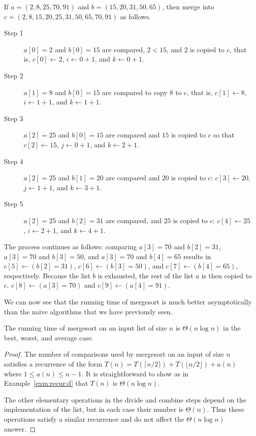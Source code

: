 \begin{Example}
If $a=(2,8,25,70,91)$ and ${b}=(15,20,31,50,65)$, 
then merge into ${c}=(2,8,15,20,25,31,50,65,70,91)$ as follows.
\begin{description}
\item[Step 1] $a[0] =2$ and $b[0] =15$ are compared, $2 < 15$, and 
$2$ is copied to $c$, that is, $c[0] \leftarrow 2$, 
\(i\leftarrow 0+1\), and \(k\leftarrow 0+1\). 
\item[Step 2] $a[1] =8$ and $b[0] =15$ are compared to copy
$8$ to ${c}$, that is, $c[1] \leftarrow 8$,  
\(i\leftarrow 1+1\), and \(k\leftarrow 1+1\). 
\item[Step 3] $a[2] =25$ and $b[0] =15$ are compared 
and $15$ is copied to ${c}$ 
so that $c[2] \leftarrow 15$, \(j\leftarrow 0+1\), 
and \(k\leftarrow 2+1\).
\item[Step 4] $a[2] =25$ and $b[1] =20$ are compared and 
$20$ is copied to ${c}$: $c[3] \leftarrow 20$, \(j\leftarrow 1+1\), 
and \(k\leftarrow 3+1\). 
\item[Step 5] $a[2] =25$ and $b[2] =31$ are
compared, and $25$ is copied to ${c}$: $c[4] \leftarrow 25$, 
\(i\leftarrow 2+1\), and \(k\leftarrow 4+1\).
\end{description} 
The
process continues as follows: comparing $a[3] =70$ and $b[2] =31$,
$a[3] =70$ and $b[3] =50$, and $a[3] =70$ and $b[4] =65$
results in $c[5] \leftarrow (b[2] = 31)$, $c[6] \leftarrow(b[3] = 50)$, and
$c[7] \leftarrow(b[4] = 65)$, respectively. Because the list 
${b}$ is exhausted, the rest of the list $a$ is then copied to ${c}$,
$c[8] \leftarrow (a[3] =70)$ and $c[9]\leftarrow (a[4] =91)$.
\end{Example}

We can now see that the running time of mergesort is much better asymptotically 
than the naive algorithms that we have previously seen.

\begin{Theorem}
The running time of mergesort on an input list of size $n$ is $\Theta(n \log n)$ 
in the best, worst, and average case.
\end{Theorem}
\begin{proof}
The number of comparisons used by 
mergesort on an input of size $n$ satisfies a recurrence of the form 
\(T(n)=T(\lceil n/2\rceil )+ T(\lfloor n/2\rfloor ) + a(n)\) where 
$1\leq a(n)\leq n-1$. It is straightforward to show 
as in Example~\ref{exm:recur:d} that $T(n)$ is $\Theta(n \log n)$.

The other elementary operations in the divide and combine steps depend on the 
implementation of the list, but in each case their number is $\Theta(n)$. Thus 
these operations satisfy a similar recurrence and do not affect the 
$\Theta(n \log n)$ answer.
\end{proof}

